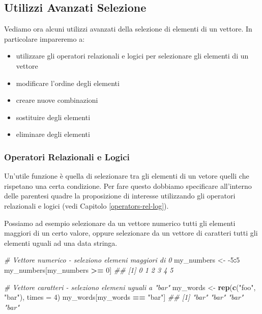\documentclass[
]{book}
\newenvironment{Shaded}{\begin{snugshade}}{\end{snugshade}}
\newcommand{\CommentTok}[1]{\textcolor[rgb]{0.56,0.35,0.01}{\textit{#1}}}
\newcommand{\DataTypeTok}[1]{\textcolor[rgb]{0.13,0.29,0.53}{#1}}
\newcommand{\DecValTok}[1]{\textcolor[rgb]{0.00,0.00,0.81}{#1}}
\newcommand{\KeywordTok}[1]{\textcolor[rgb]{0.13,0.29,0.53}{\textbf{#1}}}
\newcommand{\NormalTok}[1]{#1}
\newcommand{\OperatorTok}[1]{\textcolor[rgb]{0.81,0.36,0.00}{\textbf{#1}}}
\newcommand{\StringTok}[1]{\textcolor[rgb]{0.31,0.60,0.02}{#1}}
\providecommand{\tightlist}{%
  \setlength{\itemsep}{0pt}\setlength{\parskip}{0pt}}
\begin{document}
\hypertarget{vector-selection-advanced}{%
\subsection{Utilizzi Avanzati Selezione}\label{vector-selection-advanced}}

Vediamo ora alcuni utilizzi avanzati della selezione di elementi di un vettore. In particolare impareremo a:

\begin{itemize}
\tightlist
\item
  utilizzare gli operatori relazionali e logici per selezionare gli elementi di un vettore
\item
  modificare l'ordine degli elementi
\item
  creare nuove combinazioni
\item
  sostituire degli elementi
\item
  eliminare degli elementi
\end{itemize}

\hypertarget{operatori-relazionali-e-logici}{%
\subsubsection*{Operatori Relazionali e Logici}\label{operatori-relazionali-e-logici}}

Un'utile funzione è quella di selezionare tra gli elementi di un vetore quelli che rispetano una certa condizione. Per fare questo dobbiamo specificare all'interno delle parentesi quadre la proposizione di interesse utilizzando gli operatori relazionali e logici (vedi Capitolo \ref{operators-rel-log}).

Possiamo ad esempio selezionare da un vettore numerico tutti gli elementi maggiori di un certo valore, oppure selezionare da un vettore di caratteri tutti gli elementi uguali ad una data stringa.

\begin{Shaded}
\begin{Highlighting}[]
\CommentTok{# Vettore numerico - seleziono elemeni maggiori di 0}
\NormalTok{my_numbers <-}\StringTok{ }\DecValTok{-5}\OperatorTok{:}\DecValTok{5}
\NormalTok{my_numbers[my_numbers }\OperatorTok{>=}\StringTok{ }\DecValTok{0}\NormalTok{]}
\CommentTok{## [1] 0 1 2 3 4 5}

\CommentTok{# Vettore caratteri - seleziono elemeni uguali a "bar"}
\NormalTok{my_words <-}\StringTok{ }\KeywordTok{rep}\NormalTok{(}\KeywordTok{c}\NormalTok{(}\StringTok{"foo"}\NormalTok{, }\StringTok{"bar"}\NormalTok{), }\DataTypeTok{times =} \DecValTok{4}\NormalTok{)}
\NormalTok{my_words[my_words }\OperatorTok{==}\StringTok{ "bar"}\NormalTok{]}
\CommentTok{## [1] "bar" "bar" "bar" "bar"}
\end{Highlighting}
\end{Shaded}
\end{document}
